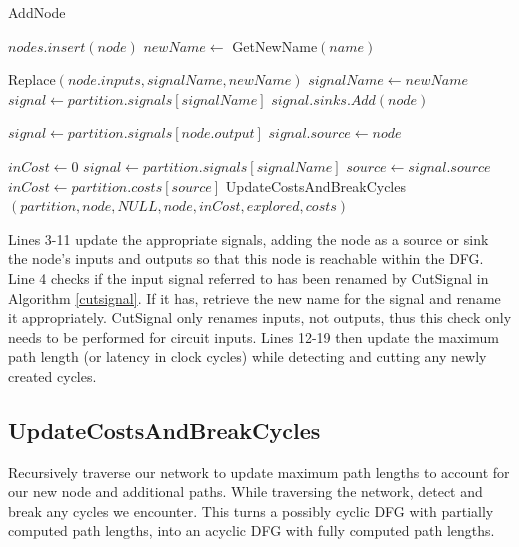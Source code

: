 \documentclass[12pt,final,oneside]{dwThesis} %
\begin{document}
\begin{algorithm}
\begin{center}
      \end{center}

      \caption{AddNode}\label{addnode} 
      \begin{algorithmic}[1]
         \State $nodes.insert(node)$
           
         \State
         $newName \gets$ GetNewName$(name)$ 

         \State Replace$(node.inputs, signalName, newName)$  
         \State $signalName
         \gets newName$ \EndIf 
         \State $signal \gets
         partition.signals[signalName]$ 
         \State $signal.sinks.Add(node)$ \EndFor

         \State $signal \gets partition.signals[node.output]$ 
         \State
         $signal.source \gets node$


         \State $inCost \gets 0$  
         \State
         $signal \gets partition.signals[signalName]$ 
         \State $source \gets
         signal.source$  
         \State $inCost
         \gets partition.costs[source]$ \EndIf \EndFor 
         \State
         UpdateCostsAndBreakCycles$(partition, node, NULL, node, inCost,
         explored, costs)$ \EndProcedure 
      \end{algorithmic}

   \end{algorithm}

   Lines 3-11 update the appropriate signals, adding the node as a source or
   sink the node's inputs and outputs so that this node is reachable within the
   \gls{DFG}.
   Line 4 checks if the input signal referred to has been renamed by CutSignal in Algorithm \ref{cutsignal}.
   If it has, retrieve the new name for the signal and rename it appropriately.
   CutSignal only renames inputs, not outputs, thus this check only needs to be performed for circuit inputs.
   Lines 12-19 then update the maximum path length (or latency in
   clock cycles) while detecting and cutting any newly created cycles.


   \newpage 
   \subsection{UpdateCostsAndBreakCycles}
   Recursively traverse our
   network to update maximum path lengths to account for our new node and
   additional paths. While traversing the network, detect and break any cycles
   we encounter.  This turns a possibly cyclic \gls{DFG} with partially
   computed path lengths, into an acyclic \gls{DFG} with fully computed path
   lengths.
\end{document}
